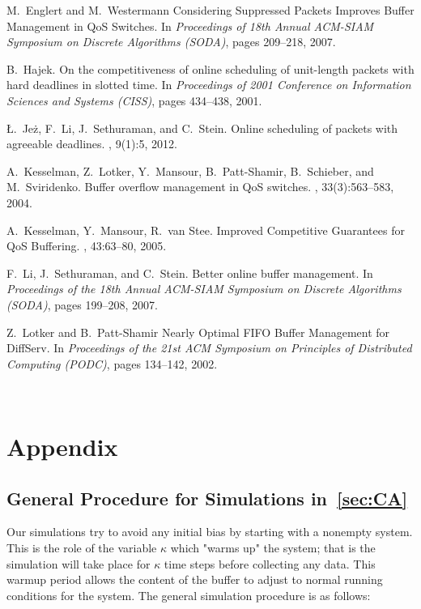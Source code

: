 \documentclass[oribibl]{llncs}
\begin{document}
\begin{thebibliography}{1}
M.~Englert and M.~Westermann
\newblock Considering Suppressed Packets Improves Buffer Management in QoS Switches.
\newblock In {\em Proceedings of 18th Annual ACM-SIAM Symposium on Discrete
  Algorithms (SODA)}, pages 209--218, 2007.

B.~Hajek.
\newblock On the competitiveness of online scheduling of unit-length packets
  with hard deadlines in slotted time.
\newblock In {\em Proceedings of 2001 Conference on Information Sciences and
  Systems (CISS)}, pages 434--438, 2001.

{\L}.~Je{\.z}, F.~Li, J.~Sethuraman, and C.~Stein.
\newblock Online scheduling of packets with agreeable deadlines.
, 9(1):5, 2012.

A.~Kesselman, Z.~Lotker, Y.~Mansour, B.~Patt-Shamir, B.~Schieber, and
  M.~Sviridenko.
\newblock Buffer overflow management in {Q}o{S} switches.
, 33(3):563--583, 2004.

A.~Kesselman, Y.~Mansour, R.~van Stee.
\newblock Improved Competitive Guarantees for QoS Buffering.
, 43:63--80, 2005.

F.~Li, J.~Sethuraman, and C.~Stein.
\newblock Better online buffer management.
\newblock In {\em Proceedings of the 18th Annual ACM-SIAM Symposium on Discrete
  Algorithms (SODA)}, pages 199--208, 2007.
  
Z.~Lotker and B.~Patt-Shamir
\newblock Nearly Optimal FIFO Buffer Management for DiffServ.
\newblock In {\em Proceedings of the 21st ACM Symposium on Principles of Distributed
Computing (PODC)}, pages 134--142, 2002.

\end{thebibliography}

\mbox{ }
\newpage
\mbox{ } 
\appendix
\section{Appendix}
\label{sec:app}
\setcounter{table}{0}
\renewcommand{\thetable}{A\arabic{table}}

\subsection{General Procedure for Simulations in~\ref{sec:CA}}
\label{app:CA}
Our simulations try to avoid any initial bias by starting with a nonempty system. This is the role of the variable $\kappa$ which "warms up" the system; that is the simulation will take place for $\kappa$ time steps before collecting any data. This warmup period allows the content of the buffer to adjust to normal running conditions for the system. The general simulation procedure is as follows:
\end{document}
